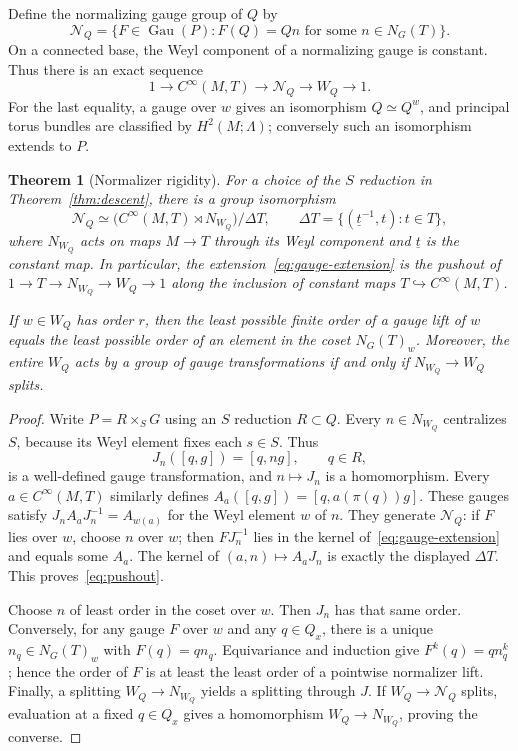 \documentclass[11pt]{amsart}
\newcommand{\Gau}{\operatorname{Gau}}
\theoremstyle{plain}
\newtheorem{theorem}{Theorem}[section]
\theoremstyle{definition}
\theoremstyle{remark}
\begin{document}
Define the normalizing gauge group of $Q$ by
\[
 \mathcal N_Q=\{F\in\Gau(P): F(Q)=Qn\text{ for some }n\in N_G(T)\}.
\]
On a connected base, the Weyl component of a normalizing gauge is constant. Thus there is an exact sequence
\begin{equation}\label{eq:gauge-extension}
 1\longrightarrow C^\infty(M,T)\longrightarrow\mathcal N_Q
 \longrightarrow W_Q\longrightarrow1.
\end{equation}
For the last equality, a gauge over $w$ gives an isomorphism $Q\simeq Q^w$, and principal torus bundles are classified by $H^2(M;\Lambda)$; conversely such an isomorphism extends to $P$.

\begin{theorem}[Normalizer rigidity]\label{thm:pushout}
For a choice of the $S$ reduction in Theorem~\ref{thm:descent}, there is a group isomorphism
\begin{equation}\label{eq:pushout}
 \mathcal N_Q\simeq
 \bigl(C^\infty(M,T)\rtimes N_{W_Q}\bigr)/\Delta T,
 \qquad
 \Delta T=\{(\underline{t}^{-1},t):t\in T\},
\end{equation}
where $N_{W_Q}$ acts on maps $M\to T$ through its Weyl component and $\underline t$ is the constant map. In particular, the extension~\eqref{eq:gauge-extension} is the pushout of $1\to T\to N_{W_Q}\to W_Q\to1$ along the inclusion of constant maps $T\hookrightarrow C^\infty(M,T)$.

If $w\in W_Q$ has order $r$, then the least possible finite order of a gauge lift of $w$ equals the least possible order of an element in the coset $N_G(T)_w$. Moreover, the entire $W_Q$ acts by a group of gauge transformations if and only if $N_{W_Q}\to W_Q$ splits.
\end{theorem}

\begin{proof}
Write $P=R\times_SG$ using an $S$ reduction $R\subset Q$. Every $n\in N_{W_Q}$ centralizes $S$, because its Weyl element fixes each $s\in S$. Thus
\[
 J_n([q,g])=[q,ng],\qquad q\in R,
\]
is a well-defined gauge transformation, and $n\mapsto J_n$ is a homomorphism. Every $a\in C^\infty(M,T)$ similarly defines $A_a([q,g])=[q,a(\pi(q))g]$. These gauges satisfy $J_n A_aJ_n^{-1}=A_{w(a)}$ for the Weyl element $w$ of $n$. They generate $\mathcal N_Q$: if $F$ lies over $w$, choose $n$ over $w$; then $FJ_n^{-1}$ lies in the kernel of~\eqref{eq:gauge-extension} and equals some $A_a$. The kernel of $(a,n)\mapsto A_aJ_n$ is exactly the displayed $\Delta T$. This proves~\eqref{eq:pushout}.

Choose $n$ of least order in the coset over $w$. Then $J_n$ has that same order. Conversely, for any gauge $F$ over $w$ and any $q\in Q_x$, there is a unique $n_q\in N_G(T)_w$ with $F(q)=qn_q$. Equivariance and induction give $F^k(q)=qn_q^k$; hence the order of $F$ is at least the least order of a pointwise normalizer lift. Finally, a splitting $W_Q\to N_{W_Q}$ yields a splitting through $J$. If $W_Q\to\mathcal N_Q$ splits, evaluation at a fixed $q\in Q_x$ gives a homomorphism $W_Q\to N_{W_Q}$, proving the converse.
\end{proof}
\end{document}

